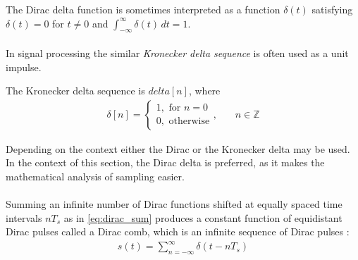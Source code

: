 The Dirac delta function is sometimes interpreted as a function $\delta(t)$ satisfying $\delta(t)=0$ for $t\neq 0$ and $\int_{-\infty}^{\infty}\!\delta(t)\,dt=1$.
\\ \\
In signal processing the similar \textit{Kronecker delta sequence} is often used as a unit impulse.
\begin{definition}\label{def:kronecker}
The Kronecker delta sequence is $delta[n]$, where
\begin{align}
\delta[n]=
\begin{cases}1,\text{ for }n=0\\
0,\text{ otherwise}
\end{cases},\phantom{mm}n\in\mathbb{Z}
\end{align}
\end{definition}

Depending on the context either the Dirac or the Kronecker delta may be used. In the context of this section, the Dirac delta is preferred, as it makes the mathematical analysis of sampling easier.\\\\
Summing an infinite number of Dirac functions shifted at equally spaced time intervals $nT_s$ as in \eqref{eq:dirac_sum} produces a constant function of equidistant Dirac pulses called a Dirac comb, which is an infinite sequence of Dirac pulses \cite{page 164, DTSP}:
\begin{align} \label{eq:dirac_sum}
s(t)=\sum_{n=-\infty}^{\infty}\delta(t-nT_s)
\end{align}

